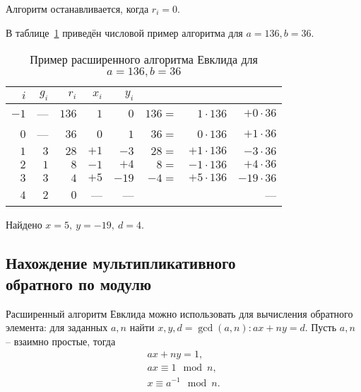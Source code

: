 Алгоритм останавливается, когда $r_i = 0$.


\example
В таблице~\ref{tab:extended-euclid} приведён числовой пример алгоритма для $a=136, b=36$.
\begin{table}[!ht]
    \centering
    \caption{Пример расширенного алгоритма Евклида для \\ $a=136, b=36$\label{tab:extended-euclid}}
    \begin{tabular}{|r|r|r|r|r|rrr|}
        \hline
        $i$ & $g_i$ & $r_i$ & $x_i$ & $y_i$ & & & \\
        \hline
        $-1$ &  --- & $136$ &   $1$ &   $0$ & $136 =$ & $ 1 \cdot 136$ & $ + 0 \cdot 36$ \\
	 $0$ &  --- &  $36$ &   $0$ &   $1$ &  $36 =$ & $ 0 \cdot 136$ & $ + 1 \cdot 36$ \\
	 $1$ &  $3$ &  $28$ &  $+1$ &  $-3$ &  $28 =$ & $+1 \cdot 136$ & $ - 3 \cdot 36$ \\
	 $2$ &  $1$ &   $8$ &  $-1$ &  $+4$ &   $8 =$ & $-1 \cdot 136$ & $ + 4 \cdot 36$ \\
	 $3$ &  $3$ &   $4$ &  $+5$ & $-19$ &  $-4 =$ & $+5 \cdot 136$ & $- 19 \cdot 36$ \\
	 $4$ &  $2$ &   $0$ &   --- &   --- & & & --- \\
        \hline
    \end{tabular}
\end{table}
Найдено $x = 5, ~ y = -19, ~ d = 4$.
\exampleend

\subsection[Нахождение мультипликативного обратного]{Нахождение мультипликативного \protect\\ обратного по модулю}

Расширенный алгоритм Евклида можно использовать для вычисления обратного элемента: для заданных $a, n$ найти $x, y, d = \gcd(a,n): ax + ny = d$. Пусть $a,n$ -- взаимно простые, тогда
\[\begin{array}{l}
	ax + ny = 1, \\
	ax \equiv 1 \mod n, \\
	x \equiv a^{-1} \mod n. \\
\end{array}\]

